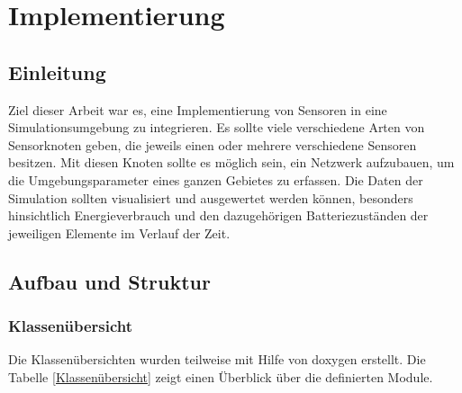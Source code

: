 \chapter{Implementierung}

\section{Einleitung}

Ziel dieser Arbeit war es, eine Implementierung von Sensoren in eine Simulationsumgebung zu integrieren. Es sollte viele verschiedene Arten von Sensorknoten geben, die jeweils einen oder mehrere verschiedene Sensoren besitzen. Mit diesen Knoten sollte es möglich sein, ein Netzwerk aufzubauen, um die Umgebungsparameter eines ganzen Gebietes zu erfassen.
Die Daten der Simulation sollten visualisiert und ausgewertet werden können, besonders hinsichtlich Energieverbrauch und den dazugehörigen Batteriezuständen der jeweiligen Elemente im Verlauf der Zeit.

\section{Aufbau und Struktur}

\subsection{Klassenübersicht}

Die Klassenübersichten wurden teilweise mit Hilfe von doxygen\cite{doxygen} erstellt. Die Tabelle \ref{Klassenübersicht} zeigt einen Überblick über die definierten Module.

